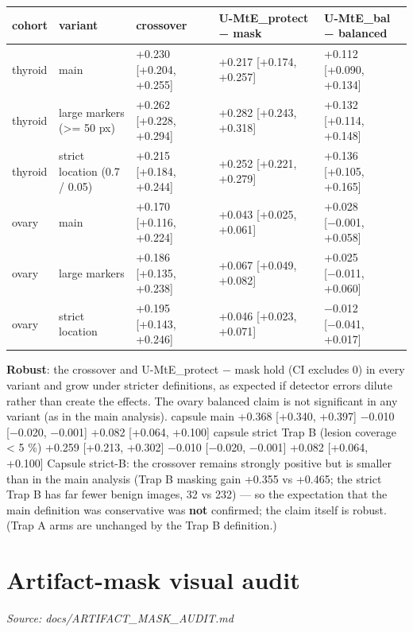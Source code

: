 {{ %
\begin{longtable}[]{@{}lllll@{}}
\toprule\noalign{}
cohort & variant & crossover & U-MtE\_protect − mask & U-MtE\_bal − balanced \\
\midrule\noalign{}
\endhead
\bottomrule\noalign{}
\endlastfoot
thyroid & main & +0.230 {[}+0.204, +0.255{]} & +0.217 {[}+0.174, +0.257{]} & +0.112 {[}+0.090, +0.134{]} \\
thyroid & large markers (\textgreater= 50 px) & +0.262 {[}+0.228, +0.294{]} & +0.282 {[}+0.243, +0.318{]} & +0.132 {[}+0.114, +0.148{]} \\
thyroid & strict location (0.7 / 0.05) & +0.215 {[}+0.184, +0.244{]} & +0.252 {[}+0.221, +0.279{]} & +0.136 {[}+0.105, +0.165{]} \\
ovary & main & +0.170 {[}+0.116, +0.224{]} & +0.043 {[}+0.025, +0.061{]} & +0.028 {[}−0.001, +0.058{]} \\
ovary & large markers & +0.186 {[}+0.135, +0.238{]} & +0.067 {[}+0.049, +0.082{]} & +0.025 {[}−0.011, +0.060{]} \\
ovary & strict location & +0.195 {[}+0.143, +0.246{]} & +0.046 {[}+0.023, +0.071{]} & −0.012 {[}−0.041, +0.017{]} \\
\end{longtable}
}

\textbf{Robust}: the crossover and U-MtE\_protect − mask hold (CI excludes 0) in every variant and grow under stricter
definitions, as expected if detector errors dilute rather than create the effects. The ovary balanced claim is not
significant in any variant (as in the main analysis).
\textbar{} capsule \textbar{} main \textbar{} +0.368 {[}+0.340, +0.397{]} \textbar{} −0.010 {[}−0.020, −0.001{]} \textbar{} +0.082 {[}+0.064, +0.100{]} \textbar{}
\textbar{} capsule \textbar{} strict Trap B (lesion coverage \textless{} 5 \%) \textbar{} +0.259 {[}+0.213, +0.302{]} \textbar{} −0.010 {[}−0.020, −0.001{]} \textbar{} +0.082 {[}+0.064, +0.100{]} \textbar{}
Capsule strict-B: the crossover remains strongly positive but is smaller than in the main analysis (Trap B masking
gain +0.355 vs +0.465; the strict Trap B has far fewer benign images, 32 vs 232) --- so the expectation that the main
definition was conservative was \textbf{not} confirmed; the claim itself is robust. (Trap A arms are unchanged by the
Trap B definition.)

}

\section{Artifact-mask visual audit}\label{doc:ARTIFACT_MASK_AUDIT}
\noindent\textit{Source: docs/ARTIFACT\_MASK\_AUDIT.md}

